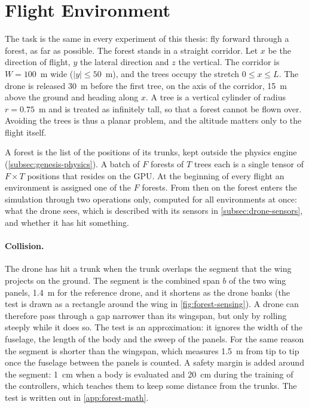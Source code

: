 \section{Flight Environment}
\label{sec:flight-environment}

The task is the same in every experiment of this thesis: fly forward through a forest, as far as possible. The forest stands in a straight corridor. Let $x$ be the direction of flight, $y$ the lateral direction and $z$ the vertical. The corridor is $W = 100$~m wide ($\lvert y \rvert \le 50$~m), and the trees occupy the stretch $0 \le x \le L$. The drone is released 30~m before the first tree, on the axis of the corridor, 15~m above the ground and heading along $x$. A tree is a vertical cylinder of radius $r = 0.75$~m and is treated as infinitely tall, so that a forest cannot be flown over. Avoiding the trees is thus a planar problem, and the altitude matters only to the flight itself.

A forest is the list of the positions of its trunks, kept outside the physics engine (\autoref{subsec:genesis-physics}). A batch of $F$ forests of $T$ trees each is a single tensor of $F \times T$ positions that resides on the GPU. At the beginning of every flight an environment is assigned one of the $F$ forests. From then on the forest enters the simulation through two operations only, computed for all environments at once: what the drone sees, which is described with its sensors in \autoref{subsec:drone-sensors}, and whether it has hit something.

\paragraph{Collision.} The drone has hit a trunk when the trunk overlaps the segment that the wing projects on the ground. The segment is the combined span $b$ of the two wing panels, 1.4~m for the reference drone, and it shortens as the drone banks (the test is drawn as a rectangle around the wing in \autoref{fig:forest-sensing}). A drone can therefore pass through a gap narrower than its wingspan, but only by rolling steeply while it does so. The test is an approximation: it ignores the width of the fuselage, the length of the body and the sweep of the panels. For the same reason the segment is shorter than the wingspan, which measures 1.5~m from tip to tip once the fuselage between the panels is counted. A safety margin is added around the segment: 1~cm when a body is evaluated and 20~cm during the training of the controllers, which teaches them to keep some distance from the trunks. The test is written out in \autoref{app:forest-math}.

